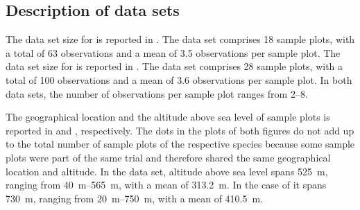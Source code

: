 \subsection{Description of data sets}

The data set size for \Beech{} is reported in .  The data set comprises 18 sample plots, with a total of 63 observations and a mean of \num{3.5} observations per sample plot.  The data set size for \Spruce{} is reported in .  The data set comprises 28 sample plots, with a total of 100 observations and a mean of \num{3.6} observations per sample plot.  In both data sets, the number of observations per sample plot ranges from \numrange{2}{8}.

The geographical location and the altitude above sea level of sample plots is reported in  and , respectively.  The dots in the plots of both figures do not add up to the total number of sample plots of the respective species because some sample plots were part of the same trial and therefore shared the same geographical location and altitude.  In the \Beech{} data set, altitude above sea level spans \SI{525}{\meter}, ranging from \SIrange{40}{565}{\meter}, with a mean of \SI{313.2}{\meter}.  In the case of \Spruce{} it spans \SI{730}{\meter}, ranging from \SIrange{20}{750}{\meter}, with a mean of \SI{410.5}{\meter}.

